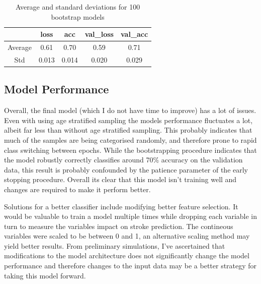 \documentclass[12pt]{article}
\begin{document}
    \begin{table}[t]
        \begin{tabular}{|c|c|c|c|c|}
            \hline
            & loss & acc & val\_loss & val\_acc \\ \hline
            Average & 0.61 & 0.70 & 0.59 & 0.71     \\ \hline
            Std & 0.013 & 0.014 & 0.020 & 0.029    \\ \hline
        \end{tabular}
        \caption{Average and standard deviations for 100 bootstrap models}
        \label{table:boot}
    \end{table}

    \subsection{Model Performance}
    Overall, the final model (which I do not have time to improve) has a lot of issues. Even with using age stratified sampling
    the models performance fluctuates a lot, albeit far less than without age stratified sampling. This probably indicates that
    much of the samples are being categorised randomly, and therefore prone to rapid class switching between epochs. While the bootstrapping
    procedure indicates that the model robustly correctly classifies around 70\% accuracy on the validation data, this result is
    probably confounded by the patience parameter of the early stopping procedure. Overall its clear that this model isn't training well
    and changes are required to make it perform better.

    Solutions for a better classifier include modifying better feature selection. It would be valuable to train a model
    multiple times while dropping each variable in turn to measure the variables impact on stroke prediction. The contineous variables
    were scaled to be between 0 and 1, an alternative scaling method may yield better results. From preliminary simulations,
    I've ascertained that modifications to the model architecture does not significantly change the model performance and therefore
    changes to the input data may be a better strategy for taking this model forward.
\end{document}
